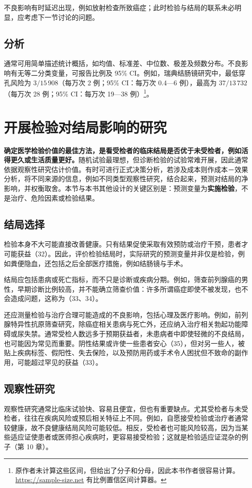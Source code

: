 不良影响有时延迟出现，例如放射检查所致癌症；此时检验与结局的联系未必明显，应考虑下一节讨论的问题。

\subsection{分析}
通常可用简单描述统计概括，如均值、标准差、中位数、极差及频数分布。不良影响有无等二分类变量，可报告比例及 95\% CI。例如，瑞典结肠镜研究中，最低穿孔风险为 $3/15\,908$（每万次 2 例；95\% CI：每万次 0.4—6 例），最高为 $37/13\,732$（每万次 28 例；95\% CI：每万次 19—38 例）\footnote{原作者未计算这些区间，但给出了分子和分母，因此本书作者很容易计算。\url{https://sample-size.net} 有比例置信区间计算器。}。

\section{开展检验对结局影响的研究}
\textbf{确定医学检验价值的最佳方法，是看受检者的临床结局是否优于未受检者，例如活得更久或生活质量更好。}随机试验最理想，但诊断检验的试验常难开展，因此通常依据观察性研究估计价值。有时可进行正式决策分析，若涉及成本则作成本－效果分析，将不同来源的信息，例如不同类型观察性研究，结合起来，预测对结局的净影响，并权衡取舍。本节与本书其他设计的关键区别是：预测变量为\textbf{实施检验}，不是治疗、危险因素或检验结果。

\subsection{结局选择}
检验本身不大可能直接改善健康。只有结果促使采取有效预防或治疗干预，患者才可能获益（32）。因此，评价检验结局时，实际研究的预测变量并非仅是检验，例如粪便隐血，还包括之后全部医疗措施，例如结肠镜与手术。

结局应包括患病或死亡指标，而不只是诊断或疾病分期。例如，筛查前列腺癌的男性，早期诊断比例较高，并不能确立筛查价值：许多所谓癌症即使不被发现，也不会造成问题，这称为（33、34）。

还应测量检验与治疗合理可能造成的不良影响，包括心理及医疗影响。例如，前列腺特异性抗原筛查研究，除癌症相关患病与死亡外，还应纳入治疗相关勃起功能障碍或尿失禁。通常受检人数远多于预期获益者，未患病者中即使轻微的不良结局，也可能因为常见而重要。阴性结果或许使一些患者安心（35），但对另一些人，被贴上疾病标签、假阳性、失去保险，以及预防用药或手术令人困扰但不致命的副作用，可能超过罕见的获益（33）。

\subsection{观察性研究}
观察性研究通常比临床试验快、容易且便宜，但也有重要缺点。尤其受检者与未受检者，往往在疾病风险或预后相关特征上不同。例如，自愿接受检验或治疗者通常较健康，故不良健康结局风险可能较低。相反，受检者也可能风险较高，因为当某些适应证使患者或医师担心疾病时，更容易接受检验；这就是检验适应证混杂的例子（第 10 章）。


